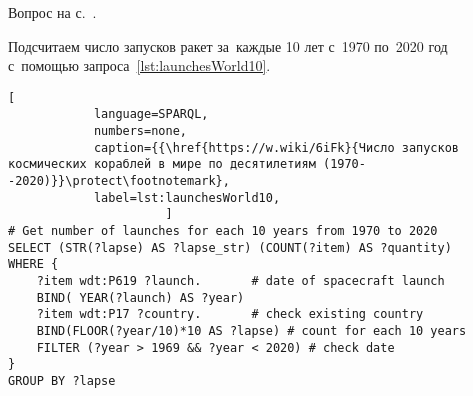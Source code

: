 \newpage
\begin{task}
    \label{answer:max-min-space-launches}
    \AnswerBackref Вопрос на с.~\pageref{question:spacecraft_2}.

    Подсчитаем число запусков ракет за~каждые 10 лет с~1970 по~2020 год с~помощью запроса~\ref{lst:launchesWorld10}.
    \begin{lstlisting}[ 
            language=SPARQL, 
            numbers=none, 
            caption={{\href{https://w.wiki/6iFk}{Число запусков космических кораблей в мире по десятилетиям (1970--2020)}}\protect\footnotemark}, 
            label=lst:launchesWorld10, 
                      ]
# Get number of launches for each 10 years from 1970 to 2020
SELECT (STR(?lapse) AS ?lapse_str) (COUNT(?item) AS ?quantity) 
WHERE {                  
    ?item wdt:P619 ?launch.       # date of spacecraft launch
    BIND( YEAR(?launch) AS ?year) 
    ?item wdt:P17 ?country.       # check existing country
    BIND(FLOOR(?year/10)*10 AS ?lapse) # count for each 10 years
    FILTER (?year > 1969 && ?year < 2020) # check date
} 
GROUP BY ?lapse
\end{lstlisting}
\end{task}



